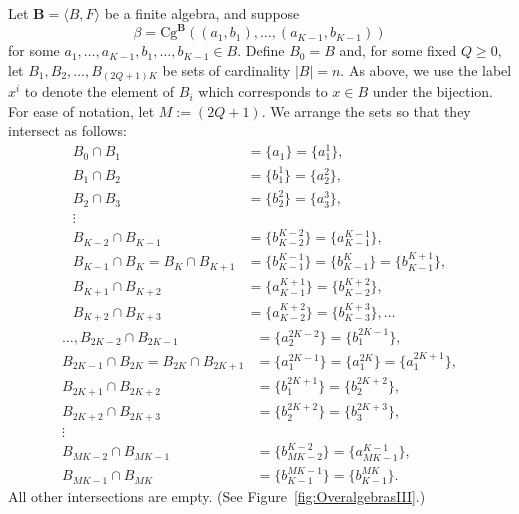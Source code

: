 \documentclass[cm,dissertation,actual,final]{uhthesis}
\theoremstyle{plain}
\theoremstyle{definition}
\theoremstyle{remark}
\numberwithin{theorem}{section}
\numberwithin{claim}{chapter}
\numberwithin{equation}{section}
\numberwithin{conjecture}{chapter}
\newcommand{\<}{\ensuremath{\langle}}
\renewcommand{\>}{\ensuremath{\rangle}}
\renewcommand{\geq}{\ensuremath{\geqslant}}
\newcommand{\Cg}{\ensuremath{\mathrm{Cg}}}
\newcommand{\supi}{\ensuremath{^{i}}}
\newcommand{\0}{\ensuremath{\mathbf{0}}}
\newcommand{\1}{\ensuremath{\mathbf{1}}}
\newcommand{\2}{\ensuremath{\mathbf{2}}}
\newcommand{\3}{\ensuremath{\mathbf{3}}}
\newcommand{\4}{\ensuremath{\mathbf{4}}}
\newcommand{\5}{\ensuremath{\mathbf{5}}}
\newcommand{\bB}{\ensuremath{\mathbf{B}}}
\begin{document}
Let $\bB = \<B, F\>$ be a finite algebra, and suppose 
\[
\beta = \Cg^{\bB}((a_1, b_1), \dots, (a_{K-1},b_{K-1}))
\]
for some $a_1, \dots, a_{K-1}, b_1, \dots, b_{K-1} \in B$.
Define $B_0=B$ and, for some fixed $Q\geq 0$, let $B_1, B_2, \dots, B_{(2Q+1)K}$ be sets of
cardinality $|B| = n$.  As above, we use the label $x^i$ to denote the element of $B_i$ which
corresponds to $x\in B$ under the bijection.  
For ease of notation, let $M:=(2Q+1)$.  
We arrange the sets so that they intersect as follows:
\begin{align*}
  B_0\cap B_1 &=\{a_1\}=\{a_1^{1}\},\\
  B_1\cap B_2 &=\{b^1_1\}=\{a_2^{2}\},\\
  B_2\cap B_3 &=\{b^2_2\}=\{a_3^{3}\},\\
\vdots\\
B_{K-2}\cap B_{K-1} &= \{b_{K-2}^{K-2}\}=\{a_{K-1}^{K-1}\},\\
  B_{K-1}\cap B_K = B_K\cap B_{K+1}&=\{b^{K-1}_{K-1}\}=\{b^{K}_{K-1}\}=\{b^{K+1}_{K-1}\},\\
  B_{K+1}\cap B_{K+2}&=\{a^{K+1}_{K-1}\} =\{b^{K+2}_{K-2}\},\\
  B_{K+2}\cap B_{K+3}&=\{a^{K+2}_{K-2}\} =\{b^{K+3}_{K-3}\}, \dots
\end{align*}
\begin{align*}
\dots,  B_{2K-2}\cap B_{2K-1} &= \{a_{2}^{2K-2}\}=\{b_{1}^{2K-1}\},\\
  B_{2K-1}\cap B_{2K} = B_{2K}\cap  B_{2K+1}&=\{a^{2K-1}_{1}\}=\{a^{2K}_{1}\}=\{a^{2K+1}_{1}\},\\
  B_{2K+1}\cap B_{2K+2}&=\{b^{2K+1}_{1}\} =\{b^{2K+2}_{2}\},\\
  B_{2K+2}\cap B_{2K+3}&=\{b^{2K+2}_{2}\} =\{b^{2K+3}_{3}\},\\
  \vdots\\
  B_{MK-2}\cap B_{MK-1} &= \{b_{MK-2}^{K-2}\}=\{a_{MK-1}^{K-1}\},\\
  B_{MK-1}\cap B_{MK}&=\{b^{MK-1}_{K-1}\}=\{b^{MK}_{K-1}\}.
\end{align*}
All other intersections are empty. (See Figure~\ref{fig:OveralgebrasIII}.)
\end{document}
